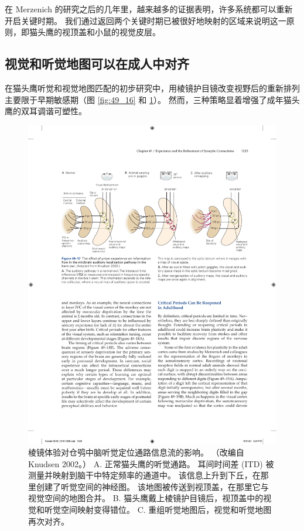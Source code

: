 在 Merzenich 的研究之后的几年里，越来越多的证据表明，许多系统都可以重新开启关键时期。
我们通过返回两个关键时期已被很好地映射的区域来说明这一原则，即猫头鹰的视顶盖和小鼠的视觉皮层。



\subsection{视觉和听觉地图可以在成人中对齐}

在猫头鹰听觉和视觉地图匹配的初步研究中，用棱镜护目镜改变视野后的重新排列主要限于早期敏感期（图 \ref{fig:49_16} 和 \ref{fig:49_17}）。
然而，三种策略显着增强了成年猫头鹰的双耳调谐可塑性。


\begin{figure}[htbp]
	\centering
	\includegraphics[width=0.95\linewidth]{chap49/fig_49_17}
	\caption{棱镜体验对仓鸮中脑听觉定位通路信息流的影响。 （改编自 Knudsen 2002。） A. 正常猫头鹰的听觉通路。 耳间时间差 (ITD) 被测量并映射到脑干中特定频率的通道中。 该信息上升到下丘，在那里创建了听觉空间的神经图。 该地图被传送到视顶盖，在那里它与视觉空间的地图合并。 B. 猫头鹰戴上棱镜护目镜后，视顶盖中的视觉和听觉空间映射变得错位。 C. 重组听觉地图后，视觉和听觉地图再次对齐。}
	\label{fig:49_17}
\end{figure}


